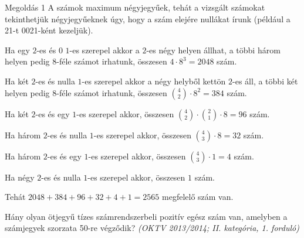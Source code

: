 \begin{solution}
Megoldás 1 A számok maximum négyjegyűek, tehát a vizsgált számokat
tekinthetjük négyjegyűeknek úgy, hogy a szám elejére nullákat írunk
(például a 21-t 0021-ként kezeljük).

Ha egy $2$-es és $0$ $1$-es szerepel akkor a $2$-es négy helyen
állhat, a többi három helyen pedig $8$-féle számot irhatunk, összesen
$4\cdot8^{3}=2048$ szám.

Ha két $2$-es és nulla $1$-es szerepel akkor a négy helyből kettön
$2$-es áll, a többi két helyen pedig $8$-féle számot irhatunk, összesen
$\binom{4}{2}\cdot8^{2}=384$ szám.

Ha két $2$-es és egy $1$-es szerepel akkor, összesen $\binom{4}{2}\cdot\binom{2}{1}\cdot8=96$
szám.

Ha három $2$-es és nulla $1$-es szerepel akkor, összesen $\binom{4}{3}\cdot8=32$
szám.

Ha három $2$-es és egy $1$-es szerepel akkor, összesen $\binom{4}{3}\cdot1=4$
szám.

Ha négy $2$-es és nulla $1$-es szerepel akkor, összesen $1$ szám.

Tehát $2048+384+96+32+4+1=2565$ megfelelő szám van. 
\end{solution}
\begin{extraproblem}
 Hány olyan ötjegyű tízes számrendszerbeli pozitív egész szám van,
amelyben a számjegyek szorzata 50-re végződik? \emph{(OKTV 2013/2014;
II. kategória, 1. forduló) }
\end{extraproblem}

